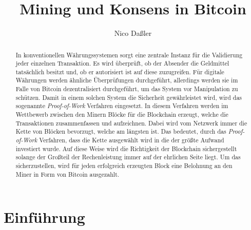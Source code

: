 \documentclass[ngerman,runningheads,a4paper]{llncs}[2018/03/10]
\begin{document}
\title{Mining und Konsens in Bitcoin}

\author{Nico Daßler}

%
%

\maketitle

\begin{abstract}
In konventionellen Währungssystemen sorgt eine zentrale Instanz für die Validierung jeder einzelnen Transaktion. Es wird überprüft, ob der Absender die Geldmittel tatsächlich besitzt und, ob er autorisiert ist auf diese zuzugreifen. Für digitale Währungen werden ähnliche Überprüfungen durchgeführt, allerdings werden sie im Falle von Bitcoin dezentralisiert durchgeführt, um das System vor Manipulation zu schützen. Damit in einem solchen System die Sicherheit gewährleistet wird, wird das sogenannte \textit{Proof-of-Work} Verfahren eingesetzt. In diesem Verfahren werden im Wettbewerb zwischen den Minern Blöcke für die Blockchain erzeugt, welche die Transaktionen zusammenfassen und aufzeichnen. Dabei wird vom Netzwerk immer die Kette von Blöcken bevorzugt, welche am längsten ist. Das bedeutet, durch das \textit{Proof-of-Work} Verfahren, dass die Kette ausgewählt wird in die der größte Aufwand investiert wurde. Auf diese Weise wird die Richtigkeit der Blockchain sichergestellt solange der Großteil der Rechenleistung immer auf der ehrlichen Seite liegt. Um das sicherzustellen, wird für jeden erfolgreich erzeugten Block eine Belohnung an den Miner in Form von Bitcoin ausgezahlt.
\end{abstract}



\section{Einführung}\label{sec:einführung}
\end{document}
